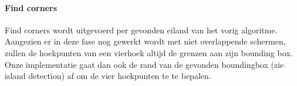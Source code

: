 \paragraph{Find corners}
Find corners wordt uitgevoerd per gevonden eiland van het vorig algoritme. Aangezien er in deze fase nog gewerkt wordt met niet overlappende schermen, zullen de hoekpunten van een vierhoek altijd de grenzen aan zijn bounding box. Onze implementatie gaat dan ook de rand van de gevonden boundingbox (zie island detection) af om de vier hoekpunten te te bepalen.


